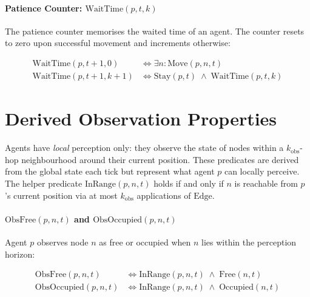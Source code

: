 \documentclass[11pt,a4paper]{article}
\begin{document}
\paragraph{Patience Counter: $\text{WaitTime}(p,t,k)$}

The patience counter memorises the waited time of an agent. The counter resets to zero upon successful movement and increments otherwise:

\begin{align}
  \text{WaitTime}(p,t{+}1,0)
    &\iff \exists n:\text{Move}(p,n,t) \label{eq:wait-reset}\\[3pt]
  \text{WaitTime}(p,t{+}1,k{+}1)
    &\iff \text{Stay}(p,t) \;\wedge\; \text{WaitTime}(p,t,k) \label{eq:wait-inc}
\end{align}

\section{Derived Observation Properties}

Agents have \emph{local} perception only: they observe the state of nodes within a
$k_{\text{obs}}$-hop neighbourhood around their current position.
These predicates are derived from the global state each tick but represent
what agent $p$ can locally perceive.
The helper predicate $\text{InRange}(p,n,t)$ holds if and only if $n$ is reachable from $p$'s
current position via at most $k_{\text{obs}}$ applications of $\text{Edge}$.

\paragraph{$\text{ObsFree}(p,n,t)$ and $\text{ObsOccupied}(p,n,t)$}

Agent $p$ observes node $n$ as free or occupied when $n$ lies within the
perception horizon:

\begin{align}
  \text{ObsFree}(p,n,t)
    &\iff \text{InRange}(p,n,t) \;\wedge\; \text{Free}(n,t) \label{eq:obsfree}\\[3pt]
  \text{ObsOccupied}(p,n,t)
    &\iff \text{InRange}(p,n,t) \;\wedge\; \text{Occupied}(n,t) \label{eq:obsoccupied}
\end{align}
\end{document}

